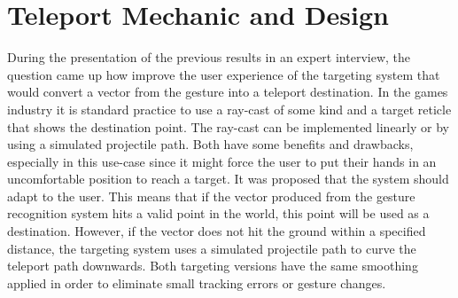 \section{Teleport Mechanic and Design}
During the presentation of the previous results in an expert interview, the question came up how improve the user experience of the targeting system that would convert a vector from the gesture into a teleport destination. In the games industry it is standard practice to use a ray-cast of some kind and a target reticle that shows the destination point. The ray-cast can be implemented linearly or by using a simulated projectile path. Both have some benefits and drawbacks, especially in this use-case since it might force the user to put their hands in an uncomfortable position to reach a target. It was proposed that the system should adapt to the user. This means that if the vector produced from the gesture recognition system hits a valid point in the world, this point will be used as a destination. However, if the vector does not hit the ground within a specified distance, the targeting system uses a simulated projectile path to curve the teleport path downwards. Both targeting versions have the same smoothing applied in order to eliminate small tracking errors or gesture changes.

